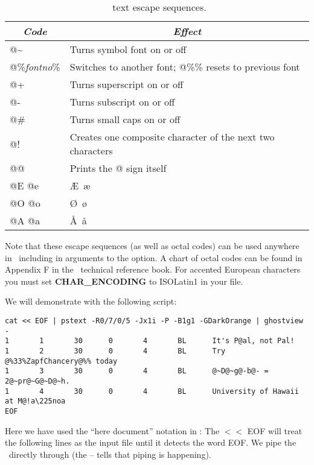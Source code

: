 \documentclass{report}
\begin{document}
\begin{table}[h]
\small
\centering
\begin{tabular}{|l|l|} \hline
\multicolumn{1}{|c|}{\emph{Code}}       &       \multicolumn{1}{c|}{\emph{Effect}} \\ \hline
@\~     &       Turns symbol font on or off \\ \hline 
@\%{\it fontno}\%       &       Switches to another font; @\%\% resets to previous font \\ \hline 
@+      &       Turns superscript on or off \\ \hline 
@-      &       Turns subscript on or off \\ \hline 
@\#     &       Turns small caps on or off \\ \hline 
@!      &       Creates one composite character of the next two characters \\ \hline 
@@      &       Prints the @ sign itself \\ \hline 
@E @e   &  \AE\ \ae \\  \hline
@O @o   &  \O\ \o \\  \hline
@A @a   &  \AA\ \aa \\ \hline
\end{tabular}
\caption{\gmt\ text escape sequences.}
\label{tbl:escape}
\end{table}

Note that these escape sequences (as well as octal codes) can be
used anywhere in \GMT\, including in arguments to the  option.
A chart of octal codes can be found in Appendix F in the \GMT\
technical reference book.  For accented European characters you must
set {\bf CHAR\_ENCODING} to ISOLatin1 in your  file.

We will demonstrate  with the following script:

\begin{verbatim} 
cat << EOF | pstext -R0/7/0/5 -Jx1i -P -B1g1 -GDarkOrange | ghostview -
1       1       30      0       4       BL      It's P@al, not Pal!
1       2       30      0       4       BL      Try @%33%ZapfChancery@%% today
1       3       30      0       4       BL      @~D@~g@-b@- = 2@~pr@~G@~D@~h.
1       4       30      0       4       BL      University of Hawaii at M@!a\225noa
EOF
\end{verbatim} 


Here we have used the ``here document'' notation in \UNIX: The $<$$<$ EOF
will treat the following lines as the input file until it detects the
word EOF.  We pipe the \PS\ directly through  (the -- tells
\progname{ghostview} that piping is happening).
\end{document}

